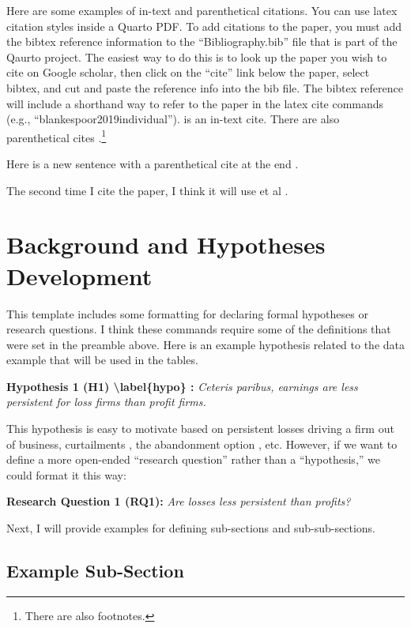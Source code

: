 \documentclass[
  authoryear,
  preprint]{elsarticle}
\begin{document}
Here are some examples of in-text and parenthetical citations. You can
use latex citation styles inside a Quarto PDF. To add citations to the
paper, you must add the bibtex reference information to the
``Bibliography.bib'' file that is part of the Qaurto project. The
easiest way to do this is to look up the paper you wish to cite on
Google scholar, then click on the ``cite'' link below the paper, select
bibtex, and cut and paste the reference info into the bib file. The
bibtex reference will include a shorthand way to refer to the paper in
the latex cite commands (e.g., ``blankespoor2019individual'').
\citet{blankespoor2019individual} is an in-text cite. There are also
parenthetical cites
\citep[e.g,][]{doyle2006extreme, livnat2006comparing,black2017non, Bradshaw2018}.\footnote{There are also footnotes. }

Here is a new sentence with a parenthetical cite at the end
\citep{easton2024forecasting}.

The second time I cite the paper, I think it will use et al
\citep{easton2024forecasting}.

\section{Background and Hypotheses Development}\label{sec:background}

This template includes some formatting for declaring formal hypotheses
or research questions. I think these commands require some of the
definitions that were set in the preamble above. Here is an example
hypothesis related to the data example that will be used in the tables.

\textbf{Hypothesis 1 (H1) \textbackslash label\{hypo\} :} \emph{Ceteris
paribus, earnings are less persistent for loss firms than profit firms.}

This hypothesis is easy to motivate based on persistent losses driving a
firm out of business, curtailments \citep{lawrence2018losses}, the
abandonment option \citep{hayn1995information}, etc. However, if we want
to define a more open-ended ``research question'' rather than a
``hypothesis,'' we could format it this way:

\textbf{Research Question 1 (RQ1):} \emph{Are losses less persistent
than profits?}

Next, I will provide examples for defining sub-sections and
sub-sub-sections.

\subsection{Example Sub-Section}\label{sec:example}
\end{document}
